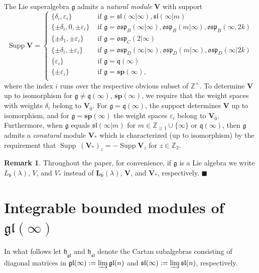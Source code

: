 \documentclass[12pt]{amsart}
\newcommand\Z{\mathbb{Z}}
\newcommand\g{\mathfrak{g}}
\newcommand\fq{\mathfrak{q}}
\newcommand\fh{\mathfrak{h}}
\newcommand\fb{\mathfrak{b}}
\newcommand\fsl{\mathfrak{sl}}
\newcommand\fosp{\mathfrak{osp}}
\newcommand\fgl{\mathfrak{gl}}
\newcommand\bV{\mathbf{V}}
\newcommand\bsp{\mathbf{sp}}
\newcommand\bL{\mathbf{L}}
\DeclareMathOperator{\Supp}{Supp} %
\theoremstyle{plain}
\theoremstyle{definition}
\newtheorem{rem}[theo]{Remark}
\numberwithin{equation}{section}
\newcommand\xqed[1]{%
  \leavevmode\unskip\penalty9999 \hbox{}\nobreak\hfill
  \quad\hbox{#1}}
\newcommand\demo{\xqed{$\blacksquare$}}
\begin{document}
The Lie superalgebra $\g$ admits a \emph{natural module} $\bV$ with support
	\[ 
\Supp \bV = \begin{cases} 
	\{\delta_i, \varepsilon_i\} & \text{ if } \g = \fsl(\infty | \infty), \fsl(\infty | m) \\
\{\pm \delta_i, 0, \pm \varepsilon_i\} & \text{ if } \g=\fosp_B(\infty|\infty), \fosp_B(m|\infty), \fosp_B(\infty, 2k) \\
\{\pm \delta_1, \pm \varepsilon_i\} & \text{ if } \g=\fosp_C(2|\infty) \\
\{\pm \delta_i, \pm \varepsilon_i\} & \text{ if } \g=\fosp_D(\infty|\infty), \fosp_D(m|\infty), \fosp_D(\infty|2k) \\
      \{\varepsilon_i\} & \text{ if } \g=\fq(\infty) \\
\{\pm \varepsilon_i\} & \text{ if } \g=\bsp(\infty), \\
  \end{cases}
	\]
where the index $i$ runs over the respective obvious subset of $\Z^\times $. To determine $\bV$ up to isomorphism for $\g\neq \fq(\infty)$, $\bsp(\infty)$, we require that the weight spaces with weights $\delta_i$ belong to $\bV_{\bar 0}$. For $\g = \fq(\infty)$, the support determines $\bV$ up to isomorphism, and for $\g = \bsp(\infty)$ the weight spaces $\varepsilon_i$ belong to $\bV_{\bar 0}$. Furthermore, when $\g$ equals $\fsl(\infty | m)$ for $m\in \Z_{\geq 1}\cup \{\infty\}$ or $\fq(\infty)$, then $\g$ admits a \emph{conatural} module $\bV_*$ which is characterized (up to isomorphism) by the requirement that $\Supp \ (\bV_*)_z = -\Supp \bV_z$ for $z\in \Z_{2}$.

\begin{rem}
Throughout the paper, for convenience, if $\g$ is a Lie algebra we write $L_\fb(\lambda)$, $V$, and $V_*$ instead of $\bL_\fb(\lambda)$, $\bV$, and $\bV_*$, respectively.
\demo
\end{rem}



\section{Integrable bounded modules of $\fgl(\infty)$}\label{sec:int.bound.gl}

In what follows let $\fh_\fgl$ and $\fh_\fsl$ denote the Cartan subalgebras consisting of diagonal matrices in $\fgl(\infty) := \varinjlim \fgl(n)$ and $\fsl(\infty) := \varinjlim \fsl(n)$, respectively.
\end{document}
